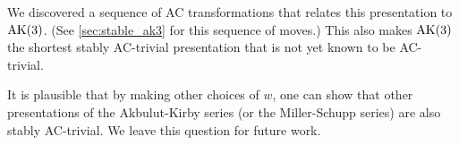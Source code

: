 We discovered a sequence of AC transformations that relates this presentation to $\text{AK}(3)$. (See \autoref{sec:stable_ak3} for this sequence of moves.) This also makes $\text{AK}(3)$ the shortest stably AC-trivial presentation that is not yet known to be AC-trivial.
\newline

It is plausible that by making other choices of $w$, one can show that other presentations of the Akbulut-Kirby series (or the Miller-Schupp series) are also stably AC-trivial. We leave this question for future work.
